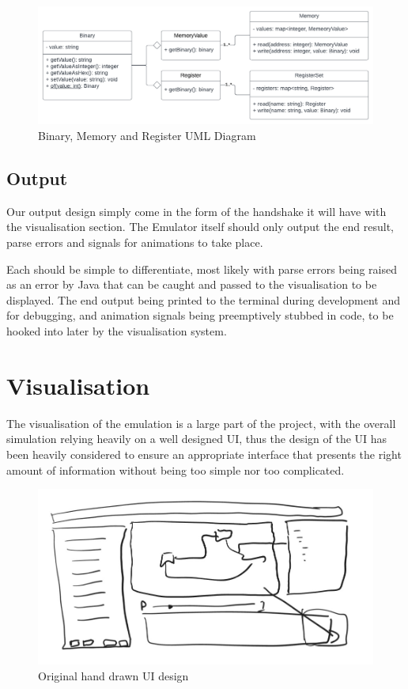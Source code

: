 \begin{figure}[H]
    \centering
    \includegraphics[width=\linewidth]{dissertation/DATA/bin_regmem_uml.png}
    \caption{Binary, Memory and Register UML Diagram}
    \label{fig:bin_regmem_uml}
\end{figure}

\subsection{Output}
Our output design simply come in the form of the handshake it will have with the visualisation section. The Emulator itself should only output the end result, parse errors and signals for animations to take place.

Each should be simple to differentiate, most likely with parse errors being raised as an error by Java that can be caught and passed to the visualisation to be displayed. The end output being printed to the terminal during development and for debugging, and animation signals being preemptively stubbed in code, to be hooked into later by the visualisation system.






\section{Visualisation}\label{sec:visualisation}
The visualisation of the emulation is a large part of the project, with the overall simulation relying heavily on a well designed \ac{UI}, thus the design of the \ac{UI} has been heavily considered to ensure an appropriate interface that presents the right amount of information without being too simple nor too complicated.

\begin{figure}[H]
    \centering
    \includegraphics[width=\linewidth]{dissertation/DATA/early_design.jpg}
    \caption{Original hand drawn UI design}
    \label{fig:early_ui_design}
\end{figure}

